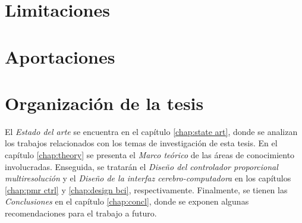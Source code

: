 \section{Limitaciones}

\section{Aportaciones}

\section{Organización de la tesis}

    El \textit{Estado del arte} se encuentra en el capítulo \ref{chap:state art}, donde se analizan los trabajos relacionados con los temas de investigación de esta tesis. En el capítulo \ref{chap:theory} se presenta el \textit{Marco teórico} de las áreas de conocimiento involucradas. Enseguida, se tratarán el \textit{Diseño del controlador proporcional multiresolución} y el \textit{Diseño de la interfaz cerebro-computadora} en los capítulos \ref{chap:pmr ctrl} y \ref{chap:design bci}, respectivamente. Finalmente, se tienen las \textit{Conclusiones} en el capítulo \ref{chap:concl}, donde se exponen algunas recomendaciones para el trabajo a futuro.
